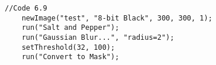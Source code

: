 \begin{lstlisting}
//Code 6.9
	newImage("test", "8-bit Black", 300, 300, 1);
	run("Salt and Pepper");
	run("Gaussian Blur...", "radius=2");
	setThreshold(32, 100);
	run("Convert to Mask");

\end{lstlisting}